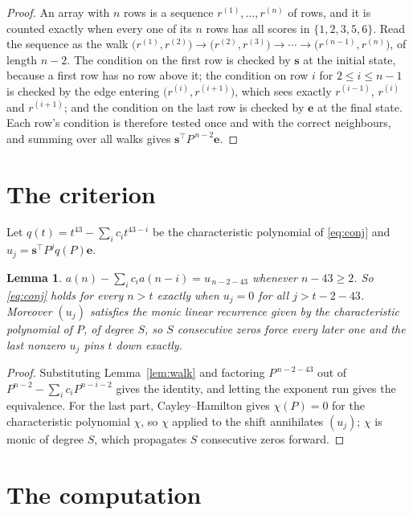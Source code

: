\documentclass[11pt,a4paper]{article}
\theoremstyle{plain}
\newtheorem{lemma}[theorem]{Lemma}
\theoremstyle{definition}
\begin{document}
\begin{proof}
An array with $n$ rows is a sequence $r^{(1)},\dots,r^{(n)}$ of rows, and it is counted
exactly when every one of its $n$ rows has all scores in $\{1,2,3,5,6\}$. Read the sequence as the
walk $\bigl(r^{(1)},r^{(2)}\bigr)\to\bigl(r^{(2)},r^{(3)}\bigr)\to\cdots\to
\bigl(r^{(n-1)},r^{(n)}\bigr)$, of length $n-2$. The condition on the first row is
checked by $\mathbf{s}$ at the initial state, because a first row has no row above it; the
condition on row $i$ for $2\le i\le n-1$ is checked by the edge entering
$\bigl(r^{(i)},r^{(i+1)}\bigr)$, which sees exactly $r^{(i-1)}$, $r^{(i)}$ and
$r^{(i+1)}$; and the condition on the last row is checked by $\mathbf{e}$ at the final
state. Each row's condition is therefore tested once and with the correct neighbours, and
summing over all walks gives $\mathbf{s}^{\!\top}P^{\,n-2}\mathbf{e}$.
\end{proof}

\section{The criterion}

Let $q(t)=t^{43}-\sum_i c_i t^{43-i}$ be the characteristic polynomial of
\eqref{eq:conj} and $u_j=\mathbf{s}^{\!\top}P^{j}q(P)\mathbf{e}$.

\begin{lemma}\label{lem:crit}
$a(n)-\sum_i c_i a(n-i)=u_{\,n-2-43}$ whenever $n-43\ge2$. So \eqref{eq:conj}
holds for every $n>t$ exactly when $u_j=0$ for all $j>t-2-43$. Moreover $(u_j)$
satisfies the monic linear recurrence given by the characteristic polynomial of $P$, of
degree $S$, so $S$ consecutive zeros force every later one and the last nonzero $u_j$ pins
$t$ down exactly.
\end{lemma}

\begin{proof}
Substituting Lemma~\ref{lem:walk} and factoring $P^{\,n-2-43}$ out of
$P^{n-2}-\sum_i c_i P^{n-i-2}$ gives the identity, and letting the exponent run gives the
equivalence. For the last part, Cayley--Hamilton gives $\chi(P)=0$ for the characteristic
polynomial $\chi$, so $\chi$ applied to the shift annihilates $(u_j)$; $\chi$ is monic of
degree $S$, which propagates $S$ consecutive zeros forward.
\end{proof}

\section{The computation}
\end{document}
